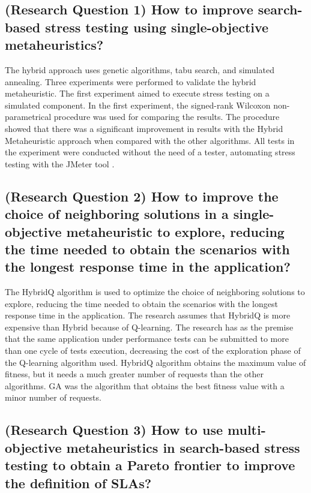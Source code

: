 \documentclass[espaco=umemeio,chapter=TITLE,twoside,openright]{abnt}
\begin{document}
\subsection{\textbf{(Research Question 1)} How to improve search-based stress testing using single-objective metaheuristics?}


The hybrid approach uses genetic algorithms, tabu search, and simulated annealing. Three experiments were performed to validate the hybrid metaheuristic. The first experiment aimed to execute stress testing on a simulated component. In the first experiment, the signed-rank Wilcoxon non-parametrical procedure was used for comparing the results. The procedure showed that there was a significant improvement in  results with the Hybrid Metaheuristic approach when compared with the other algorithms. All tests in the experiment were conducted without the need of a tester, automating  stress testing with the JMeter tool \cite{Gois2016}. 



\subsection{\textbf{(Research Question 2)} How to improve the choice of neighboring solutions in a single-objective metaheuristic to explore, reducing the time needed to obtain the scenarios with the longest response time in the application?}


The HybridQ algorithm is used to optimize the choice of neighboring solutions to explore, reducing the time needed to obtain the scenarios with the longest response time in the application. The research assumes that HybridQ is more expensive than Hybrid because of Q-learning. The research has as the premise that the same application under performance tests can be submitted to more than one cycle of tests execution, decreasing the cost of the exploration phase of the Q-learning algorithm used. HybridQ algorithm obtains the maximum value of fitness, but it needs a much greater number of requests than the other algorithms. GA was the algorithm that obtains the best fitness value with a minor number of requests. 


\subsection{\textbf{(Research Question 3)} How to use multi-objective metaheuristics in search-based stress testing to obtain a Pareto frontier to improve the definition of SLAs?}
\end{document}
